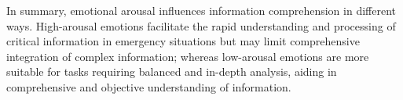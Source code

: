 In summary, emotional arousal influences information comprehension in different ways. High-arousal emotions facilitate the rapid understanding and processing of critical information in emergency situations but may limit comprehensive integration of complex information; whereas low-arousal emotions are more suitable for tasks requiring balanced and in-depth analysis, aiding in comprehensive and objective understanding of information.



